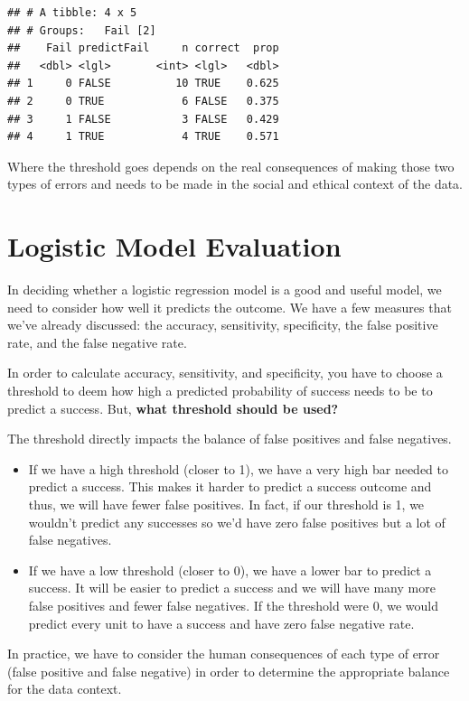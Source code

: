 \documentclass[
]{book}
\providecommand{\tightlist}{%
  \setlength{\itemsep}{0pt}\setlength{\parskip}{0pt}}
\begin{document}
\begin{verbatim}
## # A tibble: 4 x 5
## # Groups:   Fail [2]
##    Fail predictFail     n correct  prop
##   <dbl> <lgl>       <int> <lgl>   <dbl>
## 1     0 FALSE          10 TRUE    0.625
## 2     0 TRUE            6 FALSE   0.375
## 3     1 FALSE           3 FALSE   0.429
## 4     1 TRUE            4 TRUE    0.571
\end{verbatim}

Where the threshold goes depends on the real consequences of making those two types of errors and needs to be made in the social and ethical context of the data.

\section{Logistic Model Evaluation}\label{logistic-model-evaluation}

In deciding whether a logistic regression model is a good and useful model, we need to consider how well it predicts the outcome. We have a few measures that we've already discussed: the accuracy, sensitivity, specificity, the false positive rate, and the false negative rate.

In order to calculate accuracy, sensitivity, and specificity, you have to choose a threshold to deem how high a predicted probability of success needs to be to predict a success. But, \textbf{what threshold should be used?}

The threshold directly impacts the balance of false positives and false negatives.

\begin{itemize}
\tightlist
\item
  If we have a high threshold (closer to 1), we have a very high bar needed to predict a success. This makes it harder to predict a success outcome and thus, we will have fewer false positives. In fact, if our threshold is 1, we wouldn't predict any successes so we'd have zero false positives but a lot of false negatives.
\item
  If we have a low threshold (closer to 0), we have a lower bar to predict a success. It will be easier to predict a success and we will have many more false positives and fewer false negatives. If the threshold were 0, we would predict every unit to have a success and have zero false negative rate.
\end{itemize}

In practice, we have to consider the human consequences of each type of error (false positive and false negative) in order to determine the appropriate balance for the data context.
\end{document}

